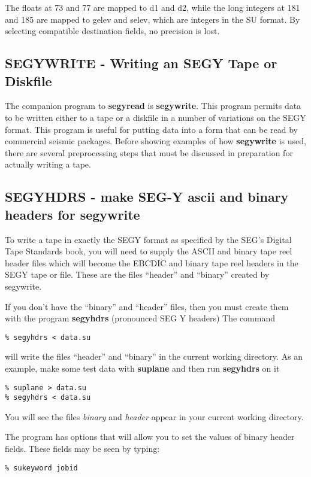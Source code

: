 {{{The floats at 73 and 77 are mapped to d1 and d2, while the long integers at 
181 and 185 are mapped to gelev and selev, which are integers in the
SU format. By selecting compatible destination fields, no precision
is lost.

\subsection{SEGYWRITE - Writing an SEGY Tape or Diskfile}
The companion program to {\bf segyread\/} is {\bf segywrite}. This program
permits data to be written either to a tape or a diskfile in
a number of variations on the SEGY format.
This program is useful for putting data into a form that can be
read by commercial seismic packages.
Before showing examples of how {\bf segywrite\/} is used, there
are several preprocessing steps that must be discussed in preparation
for actually writing a tape.

\subsection{SEGYHDRS - make SEG-Y ascii and binary headers for segywrite}

To write a tape in exactly the SEGY format as specified by the
SEG's Digital Tape Standards book, you will need to supply
the ASCII and binary tape reel header files which will become
the EBCDIC and binary tape reel headers in the SEGY tape or file.
These are the files ``header'' and ``binary'' created by segywrite. 

If you don't have the ``binary'' and ``header'' files, then you
must create them with the program {\bf segyhdrs\/} (pronounced SEG Y headers)
The command
{\small\begin{verbatim}
% segyhdrs < data.su
\end{verbatim}}\noindent
will write the files  ``header'' and ``binary'' in the current working
directory.
As an example, make some test data with {\bf suplane\/} and then
run {\bf segyhdrs\/} on it
{\small\begin{verbatim}
% suplane > data.su
% segyhdrs < data.su
\end{verbatim}}\noindent
You will see the files {\em binary\/} and {\em header\/} appear in
your current working directory.

The program has options that will allow you to set the
values of binary header fields. 
These fields may be seen by typing:
{\small\begin{verbatim}
% sukeyword jobid


\end{verbatim}}}}}
